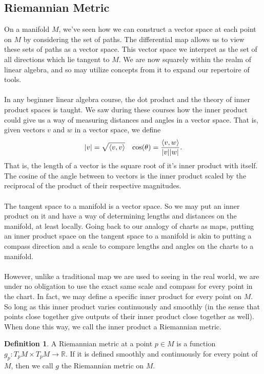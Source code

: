\documentclass[]{article}
\newcommand\<{\ensuremath{\left\langle}}
\renewcommand\>{\ensuremath{\right\rangle}}
\newcommand{\RR}{\ensuremath{\mathbb{R}}}
\theoremstyle{definition}
\newtheorem{definition}{Definition}[section]
\theoremstyle{definition}
\begin{document}
	\subsection*{Riemannian Metric}
	On a manifold $M$, we've seen how we can construct a vector space at each point on $M$ by considering the set of paths. The differential map allows us to view these sets of paths as a vector space. This vector space we interpret as the set of all directions which lie tangent to $M$. We are now squarely within the realm of linear algebra, and so may utilize concepts from it to expand our repertoire of tools.\\
	\\
	In any beginner linear algebra course, the dot product and the theory of inner product spaces is taught. We saw during these courses how the inner product could give us a way of measuring distances and angles in a vector space. That is, given vectors $v$ and $w$ in a vector space, we define
	\begin{align*}
		|v| = \sqrt{\<v,v\>} && \cos(\theta) = \frac{\<v,w\>}{|v||w|}.
	\end{align*}
	That is, the length of a vector is the square root of it's inner product with itself. The cosine of the angle between to vectors is the inner product scaled by the reciprocal of the product of their respective magnitudes.\\
	\\
	The tangent space to a manifold is a vector space. So we may put an inner product on it and have a way of determining lengths and distances on the manifold, at least locally. Going back to our analogy of charts as maps, putting an inner product space on the tangent space to a manifold is akin to putting a compass direction and a scale to compare lengths and angles on the charts to a manifold.\\
	\\
	However, unlike a traditional map we are used to seeing in the real world, we are under no obligation to use the exact same scale and compass for every point in the chart. In fact, we may define a specific inner product for every point on $M$. So long as this inner product varies continuously and smoothly (in the sense that points close together give outputs of their inner product close together as well). When done this way, we call the inner product a Riemannian metric.
	\begin{definition}
		A Riemannian metric at a point $p \in M$ is a function $g_p : T_pM \times T_pM \to \RR$. If it is defined smoothly and continuously for every point of $M$, then we call $g$ the Riemannian metric on $M$.
	\end{definition}
	
\end{document}
